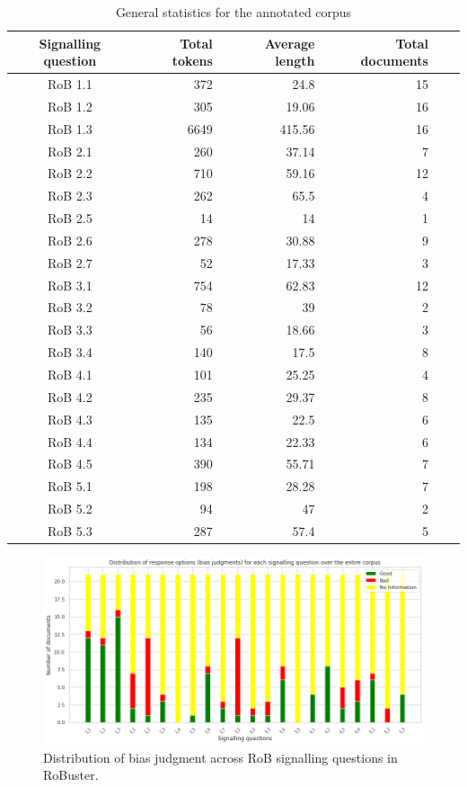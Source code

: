 \documentclass[sn-mathphys,Numbered]{sn-jnl}%
\theoremstyle{thmstyleone}%
\theoremstyle{thmstyletwo}%
\theoremstyle{thmstylethree}%
\begin{document}
%
%
%
\begin{table}[htb]
    \centering
    \caption{General statistics for the annotated corpus}
    \label{table:stats}
    \begin{tabular}{crrrrr}
    \hline
        Signalling question & Total tokens & Average length & Total documents \\ \hline
        RoB 1.1 & 372 & 24.8 & 15 \\ 
        RoB 1.2 & 305 & 19.06 & 16 \\ 
        RoB 1.3 & 6649 & 415.56 & 16 \\ 
        RoB 2.1 & 260 & 37.14 & 7 \\ 
        RoB 2.2 & 710 & 59.16 & 12 \\ 
        RoB 2.3 & 262 & 65.5 & 4 \\ 
        RoB 2.5 & 14 & 14 & 1 \\ 
        RoB 2.6 & 278 & 30.88 & 9 \\ 
        RoB 2.7 & 52 & 17.33 & 3 \\ 
        RoB 3.1 & 754 & 62.83 & 12 \\ 
        RoB 3.2 & 78 & 39 & 2 \\ 
        RoB 3.3 & 56 & 18.66 & 3 \\ 
        RoB 3.4 & 140 & 17.5 & 8 \\ 
        RoB 4.1 & 101 & 25.25 & 4 \\ 
        RoB 4.2 & 235 & 29.37 & 8 \\ 
        RoB 4.3 & 135 & 22.5 & 6 \\ 
        RoB 4.4 & 134 & 22.33 & 6 \\ 
        RoB 4.5 & 390 & 55.71 & 7 \\ 
        RoB 5.1 & 198 & 28.28 & 7 \\ 
        RoB 5.2 & 94 & 47 & 2 \\ 
        RoB 5.3 & 287 & 57.4 & 5 \\ \hline
    \end{tabular}
\end{table}
%
%
%

%
%
%
\begin{figure}[htb]
    \centering
    \includegraphics[width=0.90\columnwidth]{figures/judgment_dist.png}
    \caption{Distribution of bias judgment across RoB signalling questions in RoBuster.}
    \label{fig:rob_information}
\end{figure}
%
%
%
\end{document}
